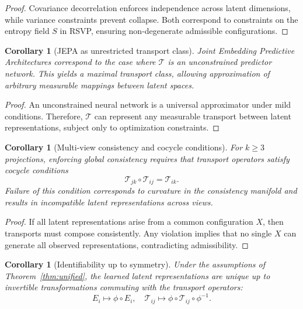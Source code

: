 \documentclass[12pt, oneside]{article}
\newtheorem{corollary}[definition]{Corollary}
\begin{document}
\begin{proof}
Covariance decorrelation enforces independence across latent dimensions, while variance constraints prevent collapse. Both correspond to constraints on the entropy field $S$ in RSVP, ensuring non-degenerate admissible configurations.
\end{proof}

\begin{corollary}[JEPA as unrestricted transport class]
\label{cor:jepa}
Joint Embedding Predictive Architectures correspond to the case where $\mathcal{T}$ is an unconstrained predictor network. This yields a maximal transport class, allowing approximation of arbitrary measurable mappings between latent spaces.
\end{corollary}

\begin{proof}
An unconstrained neural network is a universal approximator under mild conditions. Therefore, $\mathcal{T}$ can represent any measurable transport between latent representations, subject only to optimization constraints.
\end{proof}

\begin{corollary}[Multi-view consistency and cocycle conditions]
\label{cor:cocycle}
For $k \geq 3$ projections, enforcing global consistency requires that transport operators satisfy cocycle conditions
\[
\mathcal{T}_{jk} \circ \mathcal{T}_{ij} = \mathcal{T}_{ik}.
\]
Failure of this condition corresponds to curvature in the consistency manifold and results in incompatible latent representations across views.
\end{corollary}

\begin{proof}
If all latent representations arise from a common configuration $X$, then transports must compose consistently. Any violation implies that no single $X$ can generate all observed representations, contradicting admissibility.
\end{proof}

\begin{corollary}[Identifiability up to symmetry]
\label{cor:identifiability}
Under the assumptions of Theorem~\ref{thm:unified}, the learned latent representations are unique up to invertible transformations commuting with the transport operators:
\[
E_i \mapsto \phi \circ E_i,
\quad
\mathcal{T}_{ij} \mapsto \phi \circ \mathcal{T}_{ij} \circ \phi^{-1}.
\]
\end{corollary}
\end{document}
